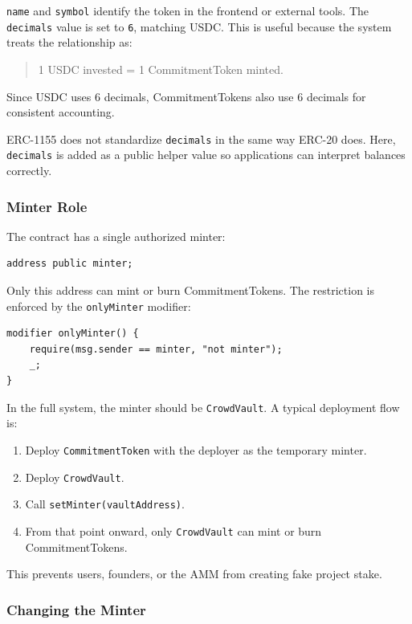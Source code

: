 \documentclass[11pt,a4paper]{article}
\begin{document}
\texttt{name} and \texttt{symbol} identify the token in the frontend or external tools. The \texttt{decimals} value is set to \texttt{6}, matching USDC. This is useful because the system treats the relationship as:

\begin{quote}
1 USDC invested = 1 CommitmentToken minted.
\end{quote}

Since USDC uses 6 decimals, CommitmentTokens also use 6 decimals for consistent accounting.

ERC-1155 does not standardize \texttt{decimals} in the same way ERC-20 does. Here, \texttt{decimals} is added as a public helper value so applications can interpret balances correctly.

\subsubsection{Minter Role}

The contract has a single authorized minter:

\begin{lstlisting}
address public minter;
\end{lstlisting}

Only this address can mint or burn CommitmentTokens. The restriction is enforced by the \texttt{onlyMinter} modifier:

\begin{lstlisting}
modifier onlyMinter() {
    require(msg.sender == minter, "not minter");
    _;
}
\end{lstlisting}

In the full system, the minter should be \texttt{CrowdVault}. A typical deployment flow is:

\begin{enumerate}
  \item Deploy \texttt{CommitmentToken} with the deployer as the temporary minter.
  \item Deploy \texttt{CrowdVault}.
  \item Call \texttt{setMinter(vaultAddress)}.
  \item From that point onward, only \texttt{CrowdVault} can mint or burn CommitmentTokens.
\end{enumerate}

This prevents users, founders, or the AMM from creating fake project stake.

\subsubsection{Changing the Minter}
\end{document}
